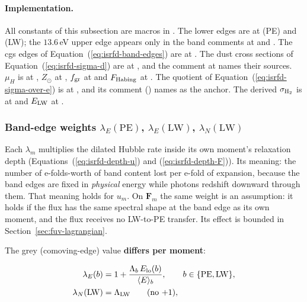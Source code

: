 \paragraph{Implementation.} All constants of this subsection are macros in
. The lower edges are at  (PE) and
 (LW); the $13.6$\,eV upper edge appears only in the band
comments at  and . The cgs
edges of Equation~(\ref{eq:isrfd-band-edges}) are at .
The dust cross sections of Equation~(\ref{eq:isrfd-sigma-d}) are at
, and the comment at  names their
sources. $\mu_H$ is at , $Z_\odot$ at ,
$f_{\rm gr}$ at  and $F_{\rm Habing}$ at
. The quotient of
Equation~(\ref{eq:isrfd-sigma-over-e}) is at , and its
comment () names \citet{Sternberg2014} as the anchor. The
derived $\sigma_{\rm H_2}$ is at  and $E_{\rm LW}$ at
.

\subsubsection{Band-edge weights $\lambda_E(\mathrm{PE})$, $\lambda_E(\mathrm{LW})$, $\lambda_N(\mathrm{LW})$}
\label{sec:isrf-eqdisc-lambda}

Each $\lambda_m$ multiplies the dilated Hubble rate inside its own moment's
relaxation depth (Equations~(\ref{eq:isrfd-depth-u}) and
(\ref{eq:isrfd-depth-F})). Its meaning: the number of e-folds-worth of band
content lost per e-fold of expansion, because the band edges are fixed in
\emph{physical} energy while photons redshift downward through them. That
meaning holds for $u_m$. On $\boldsymbol{F}_m$ the same weight is an
assumption: it holds if the flux has the same spectral shape at the band edge
as its own moment, and the flux receives no LW-to-PE transfer. Its effect is
bounded in Section~\ref{sec:fuv-lagrangian}.

The grey (comoving-edge) value \textbf{differs per moment}:

\begin{align}
  \lambda_E(b) &= 1 + \frac{\Lambda_b\, E_{\rm lo}(b)}{\langle E\rangle_b},
  \qquad b \in \{\mathrm{PE}, \mathrm{LW}\},
  \label{eq:isrfd-lambda-E} \\
  \lambda_N(\mathrm{LW}) &= \Lambda_{\rm LW}
  \qquad \text{(no $+1$)},
  \label{eq:isrfd-lambda-N}
\end{align}

